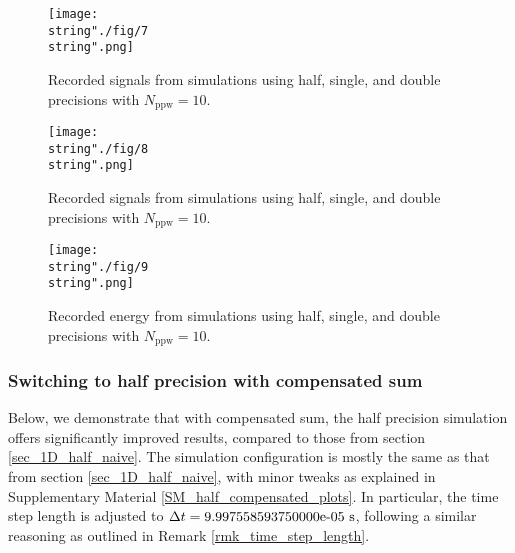 \documentclass[10pt]{article}
\begin{document}
\begin{figure}[H]
\captionsetup{width=1\textwidth, font=footnotesize,labelfont=footnotesize}
\centering
%
\centering\texttt{[image: \\string"./fig/7\\string".png]}
%
\caption{Recorded signals from simulations using half, single, and double precisions with $N_\text{ppw}=10$.}
\label{comparison_V_half_naive_single_double_ppw_10_seg_10_12}
\end{figure}


\begin{figure}[H]
\captionsetup{width=1\textwidth, font=footnotesize,labelfont=footnotesize}
\centering
%
\centering\texttt{[image: \\string"./fig/8\\string".png]}
%
\caption{Recorded signals from simulations using half, single, and double precisions with $N_\text{ppw}=10$.}
\label{comparison_V_half_naive_single_double_ppw_10_seg_98_100}
\end{figure}


\begin{figure}[H]
\captionsetup{width=1\textwidth, font=footnotesize,labelfont=footnotesize}
\centering
%
\centering\texttt{[image: \\string"./fig/9\\string".png]}
%
\caption{Recorded energy from simulations using half, single, and double precisions with $N_\text{ppw}=10$.}
\label{comparison_E_half_naive_single_double_ppw_10_seg_0_100}
\end{figure}


\subsubsection{Switching to half precision with compensated sum}\label{sec_1D_half_compensated}
Below, we demonstrate that with compensated sum, the half precision simulation offers significantly improved results, compared to those from section \ref{sec_1D_half_naive}.
%
The simulation configuration is mostly the same as that from section \ref{sec_1D_half_naive}, with minor tweaks as explained in Supplementary Material \ref{SM_half_compensated_plots}. 
%
In particular, the time step length is adjusted to $\Delta t = \text{\rm9.997558593750000e-05 s}$, following a similar reasoning as outlined in Remark \ref{rmk_time_step_length}. %
\end{document}
